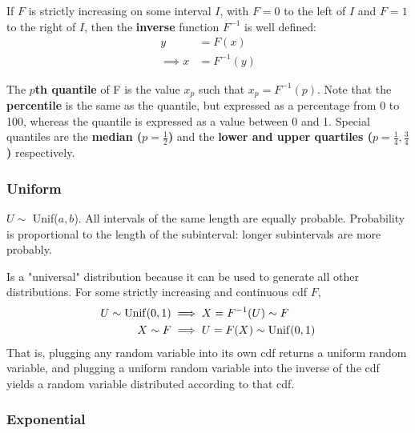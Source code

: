 \documentclass[a4paper,10pt]{article}
\begin{document}
If $F$ is strictly increasing on some interval $I$, with $F=0$ to the left of $I$ and $F=1$ to the right of $I$, then the \textbf{inverse} function $F^{-1}$ is well defined:
\begin{align*}
    y&=F(x) \\
    \implies x&=F^{-1}(y)
\end{align*}

The \textbf{$p$th quantile} of F is the value $x_p$ such that $x_p = F^{-1}(p)$. Note that the \textbf{percentile} is the same as the quantile, but expressed as a percentage from 0 to 100, whereas the quantile is expressed as a value between 0 and 1. Special quantiles are the \textbf{median ($p=\frac{1}{2}$)} and the \textbf{lower and upper quartiles ($p=\frac{1}{4}, \frac{3}{4}$)} respectively. 

\subsubsection{Uniform}

$U \sim$ Unif($a, b$). All intervals of the same length are equally probable. Probability is proportional to the length of the subinterval: longer subintervals are more probably.  

Is a "universal" distribution because it can be used to generate all other distributions. For some strictly increasing and continuous cdf $F$,
\begin{align*}
    U \sim {\rm Unif}(0, 1) &\implies X=F^{-1}(U) \sim F \\ 
    X \sim F &\implies U = F(X) \sim {\rm Unif}(0, 1)
\end{align*}
That is, plugging any random variable into its own cdf returns a uniform random variable, and plugging a uniform random variable into the inverse of the cdf yields a random variable distributed according to that cdf. 

\subsubsection{Exponential}
\end{document}
